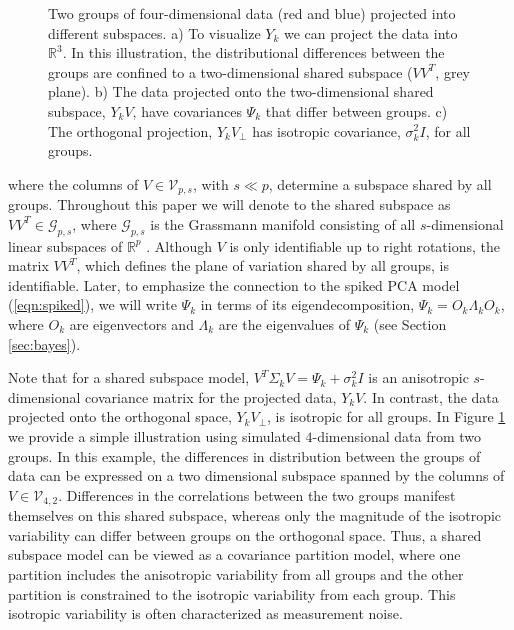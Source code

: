 \documentclass{statsoc}
\begin{document}
\begin{figure}[t]
    \centering
\quad
\quad 
{}
\caption{ Two groups of four-dimensional data (red and blue)
      projected into different subspaces.  a) To visualize $Y_k$ we
      can project the data into $\mathbb{R}^3$.  In this illustration, the
      distributional differences between the groups are confined to a
      two-dimensional shared subspace ($VV^T$, grey plane).  b) The
      data projected onto the two-dimensional shared subspace,
      $Y_kV$, have covariances $\Psi_k$ that differ between
      groups. c) The orthogonal projection, $Y_kV_{\perp}$
      has isotropic covariance, $\sigma_k^2I$, for all groups.  }
\label{fig:shared}
\end{figure}

%
\noindent where the columns of $V \in \mathcal{V}_{p, s}$, with
$s \ll p$, determine a subspace shared by all groups.  Throughout this
paper we will denote to the shared subspace as
$VV^T \in \mathcal G_{p,s}$, where $\mathcal G_{p,s}$ is the
Grassmann manifold consisting of all $s$-dimensional linear subspaces
of $\mathbb{R}^p$ \citep{Chikuse2012}.  Although $V$ is only
identifiable up to right rotations, the matrix $VV^T$, which defines
the plane of variation shared by all groups, is identifiable.  Later,
to emphasize the connection to the spiked PCA model
(\ref{eqn:spiked}), we will write $\Psi_k$ in terms of its
eigendecomposition, $\Psi_k = O_k\Lambda_kO_k$, where $O_k$ are
eigenvectors and $\Lambda_k$ are the eigenvalues of $\Psi_k$ (see
Section \ref{sec:bayes}).

Note that for a shared subspace model,
$V^T\Sigma_kV = \Psi_k + \sigma_k^2I$ is an anisotropic
$s$-dimensional covariance matrix for the projected data, $Y_kV$.  In
contrast, the data projected onto the orthogonal space,
$Y_kV_{\perp}$, is isotropic for all groups.  In Figure
\ref{fig:shared} we provide a simple illustration using simulated
$4$-dimensional data from two groups.  In this example, the
differences in distribution between the groups of data can be
expressed on a two dimensional subspace spanned by the columns of
$V \in \mathcal{V}_{4, 2}$.  Differences in the correlations between
the two groups manifest themselves on this shared subspace, whereas
only the magnitude of the isotropic variability can differ between
groups on the orthogonal space.  Thus, a shared subspace model
can be viewed as a covariance partition model, where one partition
includes the anisotropic variability from all groups and the other
partition is constrained to the isotropic variability from each group.
This isotropic variability is often characterized as measurement
noise.
\end{document}
